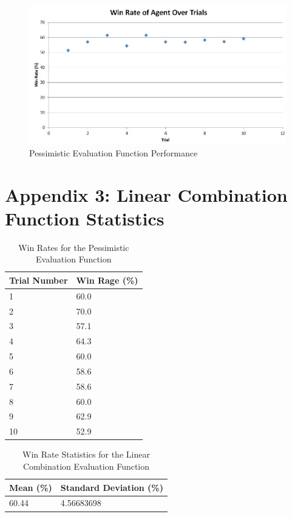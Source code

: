 \documentclass[12pt]{article}
\begin{document}
\begin{figure}[htbp]
\centering
\caption{Pessimistic Evaluation Function Performance}
\includegraphics[scale=0.71]{pessimistic-evaluation-function-results.JPG}
\end{figure}

\clearpage
\section{Appendix 3: Linear Combination Function Statistics}
\begin{table}[h]
\centering
\caption{Win Rates for the Pessimistic Evaluation Function}
\label{pessimistic-label}
\begin{tabular}{@{}|l|l|@{}}
\toprule
Trial Number & Win Rage (\%) \\ \midrule
1            & 60.0          \\ \midrule
2            & 70.0          \\ \midrule
3            & 57.1          \\ \midrule
4            & 64.3          \\ \midrule
5            & 60.0          \\ \midrule
6            & 58.6          \\ \midrule
7            & 58.6          \\ \midrule
8            & 60.0          \\ \midrule
9            & 62.9          \\ \midrule
10           & 52.9          \\ \bottomrule
\end{tabular}
\end{table}

\begin{table}[h]
\centering
\caption{Win Rate Statistics for the Linear Combination Evaluation Function}
\label{ratio-stats}
\begin{tabular}{@{}|l|l|@{}}
\toprule
Mean (\%)& Standard Deviation (\%) \\ \midrule
60.44           & 4.56683698
\\ \bottomrule
\end{tabular}
\end{table}
\end{document}
